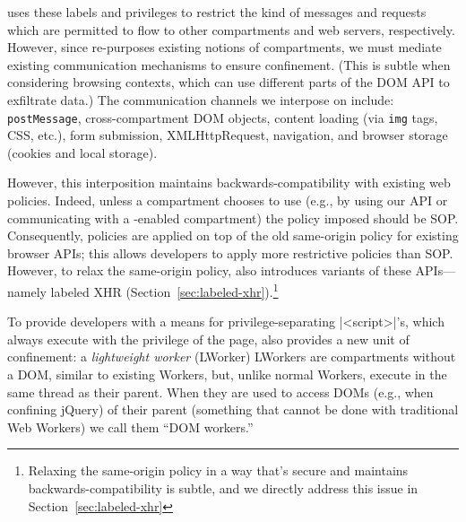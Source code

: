 \sys{} uses these labels and privileges to restrict the
kind of messages and requests which are permitted to flow to other
compartments and web servers, respectively.
%
However, since \sys{} re-purposes existing notions of compartments, we
must mediate existing communication mechanisms to ensure confinement.
%
(This is subtle when considering browsing contexts, which can use
different parts of the DOM API to exfiltrate data.)
%
The communication channels we interpose on include:
%
{\tt postMessage},
cross-compartment DOM objects,
content loading (via {\tt img} tags, CSS, etc.),
form submission,
XMLHttpRequest,
navigation, and
browser storage (cookies and local storage).

However, this interposition maintains backwards-compatibility with
existing web policies.
%
Indeed, unless a compartment chooses to use \sys{} (e.g., by using our
API or communicating with a \sys{}-enabled compartment) the policy
imposed should be SOP.
%
Consequently, \sys{} policies are applied on top of the old
same-origin policy for existing browser APIs; this allows developers
to apply more restrictive policies than SOP\@.
%
However, to relax the same-origin policy, \sys{} also introduces
variants of these APIs---namely labeled XHR
(Section~\ref{sec:labeled-xhr}).\footnote{Relaxing the same-origin
  policy in a way that's secure and maintains backwards-compatibility
  is subtle, and we directly address this issue in
Section~\ref{sec:labeled-xhr}}

To provide developers with a means for privilege-separating
\js|<script>|'s, which always execute with the privilege of the page,
\sys{} also provides a new unit of confinement: a \emph{lightweight worker}
(LWorker)
%
LWorkers are compartments without a DOM, similar to existing Workers,
but, unlike normal Workers, execute in the same thread as their
parent.
%
When they are used to access DOMs (e.g., when confining jQuery) of
their parent (something that cannot be done with traditional Web
Workers) we call them ``DOM workers.''

